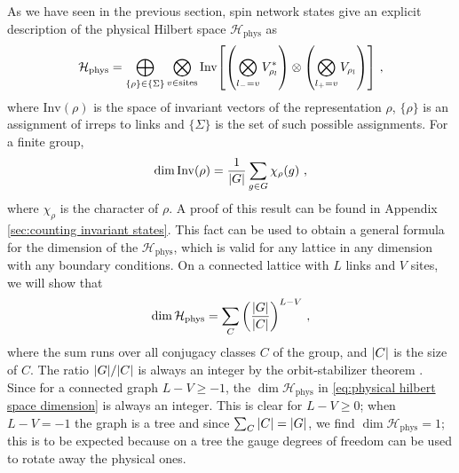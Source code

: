 As we have seen in the previous section, spin network states give an explicit description of the physical Hilbert space $\mathcal{H}_{\mathrm{phys}}$ as
\begin{equation}
    \mathcal{H}_{\mathrm{phys}} =\bigoplus_{\{\rho\} \in \{\Sigma\}} \bigotimes_{v \in \mathrm{sites}} \mathrm{Inv}\bqty{\pqty{\bigotimes_{l_- = v}  V_{\rho_l}^*} \otimes \pqty{\bigotimes_{l_+ = v}  V_{\rho_l}}} \ ,
\end{equation}
where $\mathrm{Inv}(\rho)$ is the space of invariant vectors of the representation $\rho$, $\{\rho\}$ is an assignment of irreps to links and $\{\Sigma\}$ is the set of such possible assignments. For a finite group,
\begin{equation}
    \label{eq:invariant vectors counting}
    \dim{\mathrm{Inv}(\rho)} = \frac{1}{\abs{G}} \sum_{g \in G} \chi_\rho(g) \ ,
\end{equation}
where $\chi_\rho$ is the character of $\rho$. A proof of this result can be found in Appendix \ref{sec:counting invariant states}. This fact can be used to obtain a general formula for the dimension of the $\mathcal{H}_{\mathrm{phys}}$, which is valid for any lattice in any dimension with any boundary conditions. On a connected lattice with $L$ links and $V$ sites, we will show that
\begin{equation}
    \label{eq:physical hilbert space dimension}
    \dim{\mathcal{H}_{\mathrm{phys}}} = \sum_C \pqty{\frac{\abs{G}}{\abs{C}}}^{L-V} \ ,
\end{equation}
where the sum runs over all conjugacy classes $C$ of the group, and $\abs{C}$ is the size of $C$. The ratio $\abs{G}/\abs{C}$ is always an integer by the orbit-stabilizer theorem \cite{serre1967representations}.
Since for a connected graph $L-V \geq -1$, the $\dim{\mathcal{H}_{\mathrm{phys}}}$ in \eqref{eq:physical hilbert space dimension} is always an integer.
This is clear for $L-V \geq 0$; when $L-V=-1$ the graph is a tree and since $\sum_C \abs{C}=\abs{G}$, we find $\dim{\mathcal{H}_{\mathrm{phys}}}=1$; this is to be expected because on a tree the gauge degrees of freedom can be used to rotate away the physical ones.

